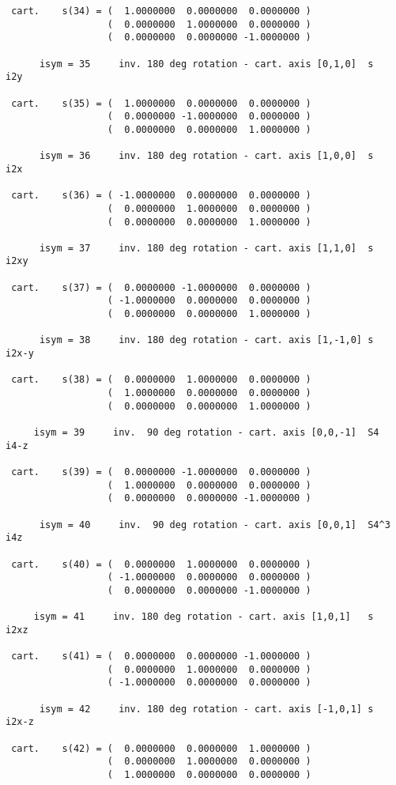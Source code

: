 \documentclass[12pt,a4paper]{article}
\begin{document}
\begin{footnotesize}
\begin{verbatim}
 cart.    s(34) = (  1.0000000  0.0000000  0.0000000 )
                  (  0.0000000  1.0000000  0.0000000 )
                  (  0.0000000  0.0000000 -1.0000000 )

      isym = 35     inv. 180 deg rotation - cart. axis [0,1,0]  s      i2y

 cart.    s(35) = (  1.0000000  0.0000000  0.0000000 )
                  (  0.0000000 -1.0000000  0.0000000 )
                  (  0.0000000  0.0000000  1.0000000 )

      isym = 36     inv. 180 deg rotation - cart. axis [1,0,0]  s      i2x

 cart.    s(36) = ( -1.0000000  0.0000000  0.0000000 )
                  (  0.0000000  1.0000000  0.0000000 )
                  (  0.0000000  0.0000000  1.0000000 )

      isym = 37     inv. 180 deg rotation - cart. axis [1,1,0]  s      i2xy

 cart.    s(37) = (  0.0000000 -1.0000000  0.0000000 )
                  ( -1.0000000  0.0000000  0.0000000 )
                  (  0.0000000  0.0000000  1.0000000 )

      isym = 38     inv. 180 deg rotation - cart. axis [1,-1,0] s      i2x-y

 cart.    s(38) = (  0.0000000  1.0000000  0.0000000 )
                  (  1.0000000  0.0000000  0.0000000 )
                  (  0.0000000  0.0000000  1.0000000 )

     isym = 39     inv.  90 deg rotation - cart. axis [0,0,-1]  S4     i4-z

 cart.    s(39) = (  0.0000000 -1.0000000  0.0000000 )
                  (  1.0000000  0.0000000  0.0000000 )
                  (  0.0000000  0.0000000 -1.0000000 )

      isym = 40     inv.  90 deg rotation - cart. axis [0,0,1]  S4^3   i4z

 cart.    s(40) = (  0.0000000  1.0000000  0.0000000 )
                  ( -1.0000000  0.0000000  0.0000000 )
                  (  0.0000000  0.0000000 -1.0000000 )

     isym = 41     inv. 180 deg rotation - cart. axis [1,0,1]   s      i2xz

 cart.    s(41) = (  0.0000000  0.0000000 -1.0000000 )
                  (  0.0000000  1.0000000  0.0000000 )
                  ( -1.0000000  0.0000000  0.0000000 )

      isym = 42     inv. 180 deg rotation - cart. axis [-1,0,1] s      i2x-z

 cart.    s(42) = (  0.0000000  0.0000000  1.0000000 )
                  (  0.0000000  1.0000000  0.0000000 )
                  (  1.0000000  0.0000000  0.0000000 )


\end{verbatim}
\end{footnotesize}
\end{document}
